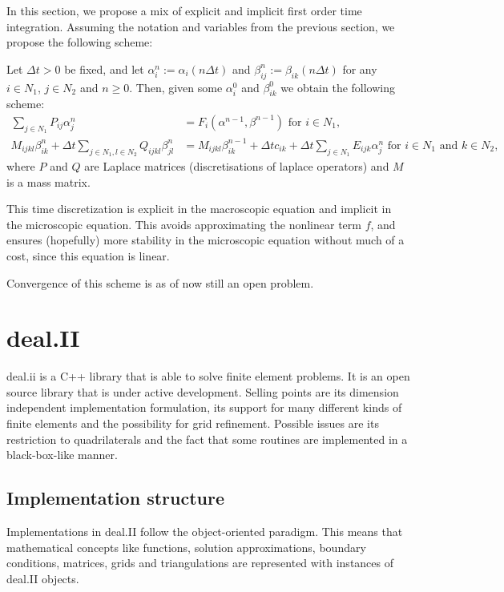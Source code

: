\documentclass{article}
\begin{document}
In this section, we propose a mix of explicit and implicit first order time integration. Assuming the notation and variables from the previous section, we propose the following scheme:

Let $\Delta t>0$ be fixed, and let $\alpha_i^n := \alpha_i(n\Delta t)$ and $\beta_{ij}^n := \beta_{ik}(n\Delta t)$ for any $i\in N_1$, $j \in N_2$ and $n\geq0$. Then, given some $\alpha_i^0$ and $\beta_{ik}^0$ we obtain the following scheme:
\begin{align}
    \sum_{j\in N_1} P_{ij} \alpha_j^n &= F_i(\alpha^{n-1},\beta^{n-1})\label{eq:discr_alpha} \mbox{ for }i\in N_1,\\
    M_{ijkl}\beta_{ik}^{n} + \Delta t\sum_{j\in N_1,l\in N_2} Q_{ijkl} \beta_{jl}^{n} &= M_{ijkl}\beta_{ik}^{n-1} + \Delta tc_{ik} + \Delta t\sum_{j\in N_1} E_{ijk}\alpha_j^{n}\label{eq:discr_beta}\mbox{ for }i\in N_1\mbox{ and }k \in N_2,
\end{align}
where $P$ and $Q$ are Laplace matrices (discretisations of laplace operators) and $M$ is a mass matrix.

This time discretization is explicit in the macroscopic equation and implicit in the microscopic equation. This avoids approximating the nonlinear term $f$, and ensures (hopefully) more stability in the microscopic equation without much of a cost, since this equation is linear.

Convergence of this scheme is as of now still an open problem.

\section{deal.II}
\label{sec:dealii}

deal.ii is a C++ library that is able to solve finite element problems. It is an open source library that is under active development. Selling points are its dimension independent implementation formulation, its support for many different kinds of finite elements and the possibility for grid refinement. Possible issues are its restriction to quadrilaterals and the fact that some routines are implemented in a black-box-like manner.

\subsection{Implementation structure}
Implementations in deal.II follow the object-oriented paradigm. This means that mathematical concepts like functions, solution approximations, boundary conditions, matrices, grids and triangulations are represented with instances of deal.II objects.
\end{document}
